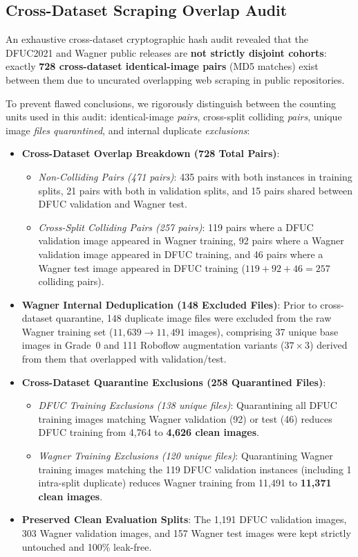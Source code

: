 \documentclass[journal]{IEEEtran}
\begin{document}
\subsection{Cross-Dataset Scraping Overlap Audit}
An exhaustive cross-dataset cryptographic hash audit revealed that the DFUC2021 and Wagner public releases are \textbf{not strictly disjoint cohorts}: exactly \textbf{728 cross-dataset identical-image pairs} (MD5 matches) exist between them due to uncurated overlapping web scraping in public repositories.

To prevent flawed conclusions, we rigorously distinguish between the counting units used in this audit: identical-image \textit{pairs}, cross-split colliding \textit{pairs}, unique image \textit{files quarantined}, and internal duplicate \textit{exclusions}:
\begin{itemize}
    \item \textbf{Cross-Dataset Overlap Breakdown (728 Total Pairs)}:
    \begin{itemize}
        \item \textit{Non-Colliding Pairs (471 pairs)}: 435 pairs with both instances in training splits, 21 pairs with both in validation splits, and 15 pairs shared between DFUC validation and Wagner test.
        \item \textit{Cross-Split Colliding Pairs (257 pairs)}: 119 pairs where a DFUC validation image appeared in Wagner training, 92 pairs where a Wagner validation image appeared in DFUC training, and 46 pairs where a Wagner test image appeared in DFUC training ($119 + 92 + 46 = 257$ colliding pairs).
    \end{itemize}
    \item \textbf{Wagner Internal Deduplication (148 Excluded Files)}: Prior to cross-dataset quarantine, 148 duplicate image files were excluded from the raw Wagner training set ($11,639 \to 11,491$ images), comprising 37 unique base images in Grade~0 and 111 Roboflow augmentation variants ($37 \times 3$) derived from them that overlapped with validation/test.
    \item \textbf{Cross-Dataset Quarantine Exclusions (258 Quarantined Files)}:
    \begin{itemize}
        \item \textit{DFUC Training Exclusions (138 unique files)}: Quarantining all DFUC training images matching Wagner validation (92) or test (46) reduces DFUC training from 4,764 to \textbf{4,626 clean images}.
        \item \textit{Wagner Training Exclusions (120 unique files)}: Quarantining Wagner training images matching the 119 DFUC validation instances (including 1 intra-split duplicate) reduces Wagner training from 11,491 to \textbf{11,371 clean images}.
    \end{itemize}
    \item \textbf{Preserved Clean Evaluation Splits}: The 1,191 DFUC validation images, 303 Wagner validation images, and 157 Wagner test images were kept strictly untouched and 100\% leak-free.
\end{itemize}
\end{document}
